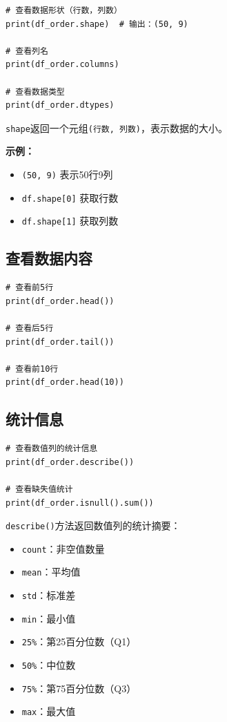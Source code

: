 \documentclass[12pt,a4paper]{article}
\begin{document}
\begin{lstlisting}[caption={查看数据形状和列名}]
# 查看数据形状（行数，列数）
print(df_order.shape)  # 输出：(50, 9)

# 查看列名
print(df_order.columns)

# 查看数据类型
print(df_order.dtypes)
\end{lstlisting}

\begin{knowledgebox}
\texttt{shape}返回一个元组\texttt{(行数, 列数)}，表示数据的大小。

\textbf{示例：}
\begin{itemize}
    \item \texttt{(50, 9)} 表示50行9列
    \item \texttt{df.shape[0]} 获取行数
    \item \texttt{df.shape[1]} 获取列数
\end{itemize}
\end{knowledgebox}

\subsection{查看数据内容}

\begin{lstlisting}[caption={查看数据内容}]
# 查看前5行
print(df_order.head())

# 查看后5行
print(df_order.tail())

# 查看前10行
print(df_order.head(10))
\end{lstlisting}

\subsection{统计信息}

\begin{lstlisting}[caption={使用describe()查看统计信息}]
# 查看数值列的统计信息
print(df_order.describe())

# 查看缺失值统计
print(df_order.isnull().sum())
\end{lstlisting}

\begin{knowledgebox}
\texttt{describe()}方法返回数值列的统计摘要：
\begin{itemize}
    \item \texttt{count}：非空值数量
    \item \texttt{mean}：平均值
    \item \texttt{std}：标准差
    \item \texttt{min}：最小值
    \item \texttt{25\%}：第25百分位数（Q1）
    \item \texttt{50\%}：中位数
    \item \texttt{75\%}：第75百分位数（Q3）
    \item \texttt{max}：最大值
\end{itemize}
\end{knowledgebox}
\end{document}
